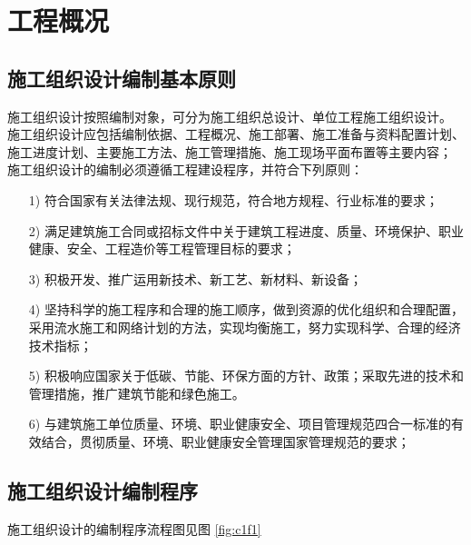 \section{工程概况}
\subsection{施工组织设计编制基本原则}

施工组织设计按照编制对象，可分为施工组织总设计、单位工程施工组织设计。
施工组织设计应包括编制依据、工程概况、施工部署、施工准备与资料配置计划、
施工进度计划、主要施工方法、施工管理措施、施工现场平面布置等主要内容；
施工组织设计的编制必须遵循工程建设程序，并符合下列原则：

\begin{itemize}

    \item [1)] 符合国家有关法律法规、现行规范，符合地方规程、行业标准的要求；

    \item [2)] 满足建筑施工合同或招标文件中关于建筑工程进度、质量、环境保护、职业健康、安全、工程造价等工程管理目标的要求；

    \item [3)] 积极开发、推广运用新技术、新工艺、新材料、新设备；

    \item [4)] 坚持科学的施工程序和合理的施工顺序，做到资源的优化组织和合理配置，采用流水施工和网络计划的方法，实现均衡施工，努力实现科学、合理的经济技术指标；

    \item [5)] 积极响应国家关于低碳、节能、环保方面的方针、政策；采取先进的技术和管理措施，推广建筑节能和绿色施工。

    \item [6)] 与建筑施工单位质量、环境、职业健康安全、项目管理规范四合一标准的有效结合，贯彻质量、环境、职业健康安全管理国家管理规范的要求；

\end{itemize}

\subsection{施工组织设计编制程序}

施工组织设计的编制程序流程图见图 \ref{fig:c1f1}

